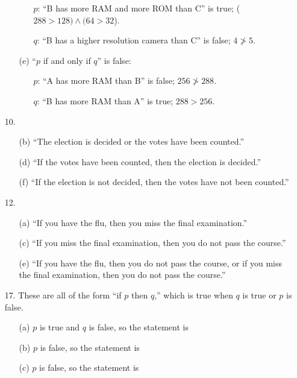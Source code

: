 \documentclass{article}
\begin{document}
\begin{enumerate}
\begin{itemize}
        \begin{itemize}
            \item[$p$:] ``B has more RAM and more ROM than C'' is true; ($288 > 128) \land (64 > 32$).
            \item[$q$:] ``B has a higher resolution camera than C'' is false; $4 \ngtr 5$.
        \end{itemize}
        \item[(e)]  ``$p$ if and only if $q$'' is false:
        \begin{itemize}
            \item[$p$:] ``A has more RAM than B'' is false; $256 \ngtr 288$.
            \item[$q$:] ``B has more RAM than A'' is true;  $288 > 256$.
        \end{itemize}
    \end{itemize}
    \item[10.]
    \begin{itemize}
        \item[(b)] ``The election is decided or the votes have been counted.''
        \item[(d)] ``If the votes have been counted, then the election is decided.''
        \item[(f)] ``If the election is not decided, then the votes have not been counted.''
    \end{itemize}
    \item[12.]
    \begin{itemize}
        \item[(a)] ``If you have the flu, then you miss the final examination.''
        \item[(c)] ``If you miss the final examination, then you do not pass the course.''
        \item[(e)] ``If you have the flu, then you do not pass the course, or if you miss the final examination, then you do not pass the course.''
    \end{itemize}
    \item[17.] These are all of the form ``if $p$ then $q$,'' which is true when $q$ is true or $p$ is false.
    \begin{itemize}
        \item[(a)] $p$ is true and $q$ is false, so the statement is 
        \item[(b)] $p$ is false, so the statement is 
        \item[(c)] $p$ is false, so the statement is 

\end{itemize}
\end{enumerate}
\end{document}
